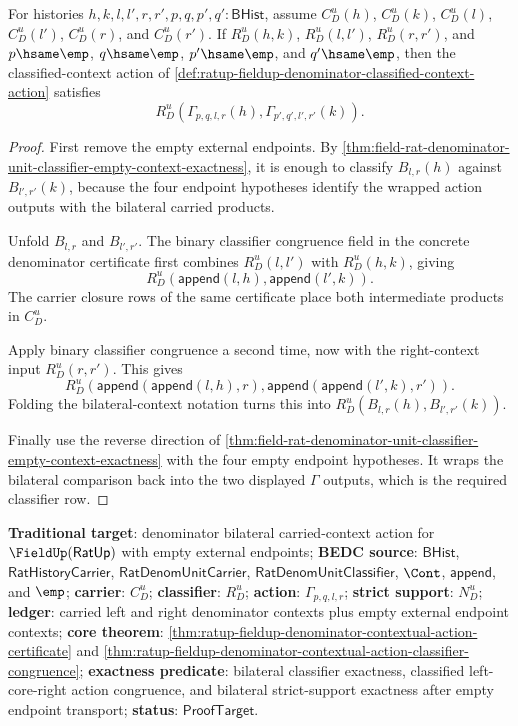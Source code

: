 \begin{theorem}
\label{thm:ratup-fieldup-denominator-contextual-action-classifier-congruence}
For histories $h,k,l,l',r,r',p,q,p',q':\mathsf{BHist}$, assume
$C_D^u(h)$, $C_D^u(k)$, $C_D^u(l)$, $C_D^u(l')$, $C_D^u(r)$, and $C_D^u(r')$.
If $R_D^u(h,k)$, $R_D^u(l,l')$, $R_D^u(r,r')$, and
$p\hsame\emp$, $q\hsame\emp$, $p'\hsame\emp$, and $q'\hsame\emp$, then the
classified-context action of
\autoref{def:ratup-fieldup-denominator-classified-context-action} satisfies
$$
R_D^u(\Gamma_{p,q,l,r}(h),\Gamma_{p',q',l',r'}(k)).
$$
\end{theorem}
\begin{proof}
First remove the empty external endpoints. By
\autoref{thm:field-rat-denominator-unit-classifier-empty-context-exactness}, it
is enough to classify $B_{l,r}(h)$ against $B_{l',r'}(k)$, because the four
endpoint hypotheses identify the wrapped action outputs with the bilateral
carried products.

Unfold $B_{l,r}$ and $B_{l',r'}$. The binary classifier congruence field in the
concrete denominator certificate first combines $R_D^u(l,l')$ with
$R_D^u(h,k)$, giving
$$
R_D^u(\mathsf{append}(l,h),\mathsf{append}(l',k)).
$$
The carrier closure rows of the same certificate place both intermediate
products in $C_D^u$.

Apply binary classifier congruence a second time, now with the right-context
input $R_D^u(r,r')$. This gives
$$
R_D^u(\mathsf{append}(\mathsf{append}(l,h),r),
\mathsf{append}(\mathsf{append}(l',k),r')).
$$
Folding the bilateral-context notation turns this into
$R_D^u(B_{l,r}(h),B_{l',r'}(k))$.

Finally use the reverse direction of
\autoref{thm:field-rat-denominator-unit-classifier-empty-context-exactness} with
the four empty endpoint hypotheses. It wraps the bilateral comparison back into
the two displayed $\Gamma$ outputs, which is the required classifier row.
\end{proof}

\textbf{Traditional target}: denominator bilateral carried-context action for
$\FieldUp(\mathsf{RatUp})$ with empty external endpoints; \textbf{BEDC source}:
$\mathsf{BHist}$, $\mathsf{RatHistoryCarrier}$,
$\mathsf{RatDenomUnitCarrier}$, $\mathsf{RatDenomUnitClassifier}$, $\Cont$,
$\mathsf{append}$, and $\emp$; \textbf{carrier}: $C_D^u$;
\textbf{classifier}: $R_D^u$; \textbf{action}:
$\Gamma_{p,q,l,r}$; \textbf{strict support}: $N_D^u$; \textbf{ledger}: carried
left and right denominator contexts plus empty external endpoint contexts;
\textbf{core theorem}:
\autoref{thm:ratup-fieldup-denominator-contextual-action-certificate} and
\autoref{thm:ratup-fieldup-denominator-contextual-action-classifier-congruence};
\textbf{exactness predicate}: bilateral classifier exactness, classified
left-core-right action congruence, and bilateral strict-support exactness after
empty endpoint transport; \textbf{status}:
$\mathsf{ProofTarget}$.

